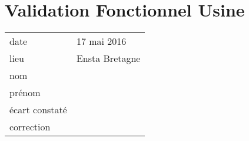 \chapter{Validation Fonctionnel Usine}

\begin{tabular}[c]{|p{}|p{}|}
\hline
date & 17 mai 2016 \\
lieu & Ensta Bretagne \\
nom & \\
prénom & \\
\hline
écart constaté & \\
\hline
correction & \\
\hline
\end{tabular}

